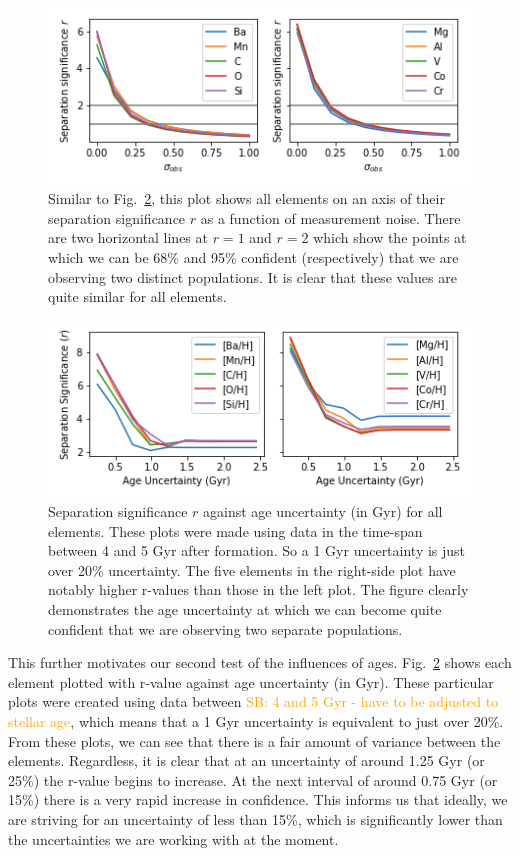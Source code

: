 \documentclass[fleqn,usenatbib]{mnras}
\newcommand{\SB}[1]{{\textcolor{orange}{SB: #1}}}
\begin{document}
\begin{figure}
	\includegraphics[width=\columnwidth]{figures/same_axis_r_sigma.png}
    \caption{Similar to Fig.~\ref{fig:r_v_age}, this plot shows all elements on an axis of their separation significance $r$ as a function of measurement noise. There are two horizontal lines at $r=1$ and $r=2$ which show the points at which we can be 68\% and 95\% confident (respectively) that we are observing two distinct populations. It is clear that these values are quite similar for all elements.}
    \label{fig:r_v_obs}
\end{figure}



\begin{figure}
	\includegraphics[width=\columnwidth]{figures/same_axis_r_age.png}
    \caption{Separation significance $r$ against age uncertainty (in Gyr) for all elements. These plots were made using data in the time-span between 4 and 5 Gyr after formation. So a 1 Gyr uncertainty is just over 20\% uncertainty. The five elements in the right-side plot have notably higher r-values than those in the left plot. The figure clearly demonstrates the age uncertainty at which we can become quite confident that we are observing two separate populations.}
    \label{fig:r_v_age}
\end{figure}

This further motivates our second test of the influences of ages. Fig.~\ref{fig:r_v_age} shows each element plotted with r-value against age uncertainty (in Gyr). These particular plots were created using data between \SB{4 and 5 Gyr - have to be adjusted to stellar age}, which means that a 1 Gyr uncertainty is equivalent to just over 20\%. From these plots, we can see that there is a fair amount of variance between the elements. Regardless, it is clear that at an uncertainty of around 1.25 Gyr (or 25\%) the r-value begins to increase. At the next interval of around 0.75 Gyr (or 15\%) there is a very rapid increase in confidence. This informs us that ideally, we are striving for an uncertainty of less than 15\%, which is significantly lower than the uncertainties we are working with at the moment.
\end{document}
